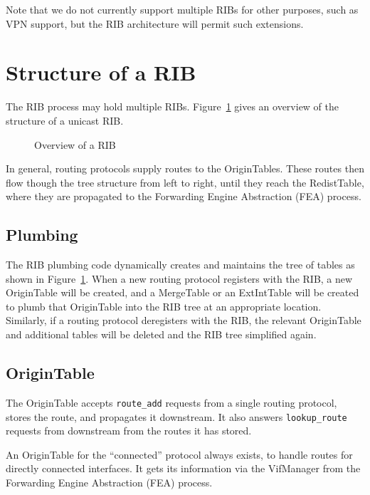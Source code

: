 \documentclass[11pt]{article}
\begin{document}
Note that we do not currently support multiple RIBs for other
purposes, such as VPN support, but the RIB architecture will permit
such extensions.

\section{Structure of a RIB}
The RIB process may hold multiple RIBs.  Figure~\ref{fig:rib_overview} gives
an overview of the structure of a unicast RIB.

\begin{figure}[htb]
  \centerline{}
  \vspace{.05in}
  \caption{\label{fig:rib_overview}Overview of a RIB}
\end{figure}

In general, routing protocols supply routes to the OriginTables.
These routes then flow though the tree structure from left to right,
until they reach the RedistTable, where they are propagated to the
Forwarding Engine Abstraction (FEA) process.

\subsection{Plumbing}

The RIB plumbing code dynamically creates and maintains the tree of
tables as shown in Figure~\ref{fig:rib_overview}.  When a new routing protocol
registers with the RIB, a new OriginTable will be created, and a
MergeTable or an ExtIntTable will be created to plumb that OriginTable
into the RIB tree at an appropriate location.  Similarly, if a routing
protocol deregisters with the RIB, the relevant OriginTable and
additional tables will be deleted and the RIB tree simplified again.

\subsection{OriginTable}

The OriginTable accepts {\tt route\_add} requests from a single routing
protocol, stores the route, and propagates it downstream.  It also
answers {\tt lookup\_route} requests from downstream from the routes it
has stored.

An OriginTable for the ``connected'' protocol always exists, to handle
routes for directly connected interfaces.  It gets its information
via the VifManager from the Forwarding Engine Abstraction (FEA)
process.
\end{document}

